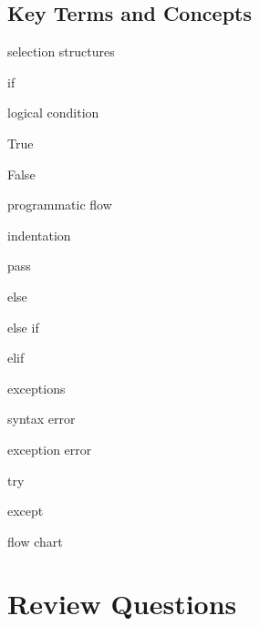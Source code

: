 \documentclass{book}
\newenvironment{key_terms}{\begin{multicols}{3}}{\end{multicols}} %
\begin{document}
    
        \subsection{Key Terms and Concepts}\label{key-terms-and-concepts}
    




    
        \begin{key_terms}
        selection structures

if

logical condition

True

False

programmatic flow

indentation

pass

else

else if

elif

exceptions

syntax error

exception error

try

except

flow chart
        \end{key_terms}

    




    
        \section{Review Questions}\label{review-questions}
    
\end{document}
